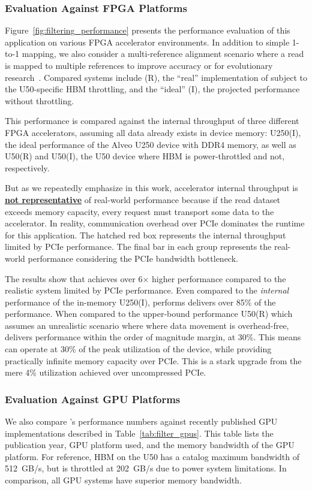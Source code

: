 \subsubsection{Evaluation Against FPGA Platforms}
Figure~\ref{fig:filtering_performance} presents the performance evaluation of this application on various FPGA accelerator environments.
In addition to simple 1-to-1 mapping, we also consider a multi-reference alignment scenario where a read is mapped to multiple references to improve accuracy or for evolutionary research~\cite{leggett2016nanookmultireference,hohl2002efficient,angiuoli2011mugsy,schmidt2019accurate}.
Compared systems include \name{}(R), the ``real'' implementation of \name{} subject to the U50-specific HBM throttling, and the ``ideal'' \name{}(I), the projected performance without throttling.

This performance is compared against the internal throughput of three different FPGA accelerators, assuming all data already exists in device memory: U250(I), the ideal performance of the Alveo U250 device with DDR4 memory, as well as U50(R) and U50(I), the U50 device where HBM is power-throttled and not, respectively.

But as we repeatedly emphasize in this work, accelerator internal throughput is \textbf{\underline{not representative}} of real-world performance because if the read dataset exceeds memory capacity, every request must transport some data to the accelerator.
In reality, communication overhead over PCIe dominates the runtime for this application.
The hatched red box represents the internal throughput limited by PCIe performance.
The final bar in each group represents the real-world performance considering the PCIe bandwidth bottleneck.

The results show that \name{} achieves over 6$\times$ higher performance compared to the realistic system limited by PCIe performance.
Even compared to the \emph{internal} performance of the in-memory U250(I), \name{} performs delivers over 85\% of the performance.
When compared to the upper-bound performance U50(R) which assumes an unrealistic scenario where where data movement is overhead-free, \name{} delivers performance within the order of magnitude margin, at 30\%.
This means \name{} can operate at 30\% of the peak utilization of the device, while providing practically infinite memory capacity over PCIe.
This is a stark upgrade from the mere 4\% utilization achieved over uncompressed PCIe.


\subsubsection{Evaluation Against GPU Platforms}
We also compare \name{}'s performance numbers against recently published GPU implementations described in Table~\ref{tab:filter_gpus}.
This table lists the publication year, GPU platform used, and the memory bandwidth of the GPU platform.
For reference, HBM on the U50 has a catalog maximum bandwidth of 512~GB/s, but is throttled at 202~GB/s due to power system limitations.
In comparison, all GPU systems have superior memory bandwidth.

